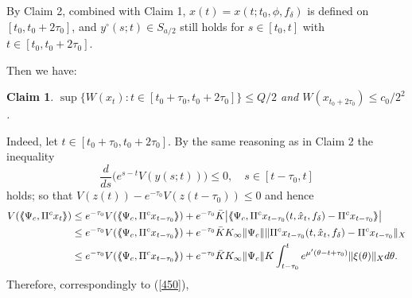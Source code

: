 \documentclass[12pt]{amsart}
\newtheorem{Claim}{Claim}
\begin{document}
\vskip 1mm
By Claim 2, combined with Claim 1, $x(t)=x(t;t_0,\phi,f_\delta)$ is defined on $[t_0,t_0+2\tau_0]$, and 
$y^\circ(s;t)\in S_{a/2}$ still holds for $s\in [t_0,t]$ with $t\in [t_0,t_0+2\tau_0]$. 

Then we have:

\begin{Claim}
$\sup\{W(x_t): t\in [t_0+\tau_0,t_0+2\tau_0]\} \leq Q/2$ 
and  $W(x_{t_0+2\tau_0})\leq c_0/2^2$. 
\end{Claim}
 
Indeed, let $t\in [t_0+\tau_0,t_0+2\tau_0]$. By the same reasoning as 
in Claim 2 the inequality  
$$
   \frac{d}{ds}\big( e^{s-t}V(y(s;t)) \big)\leq 0, \quad s\in [t-\tau_0,t]
$$
holds; so that $V(z(t))-e^{-\tau_0}V(z(t-\tau_0))\leq 0$ and hence 
\begin{align*}
   V({\langle\hspace{-1mm}\langle} \Psi_c,\Pi^c x_t{\rangle\hspace{-1mm}\rangle})
   &\leq e^{-\tau_0}V({\langle\hspace{-1mm}\langle}\Psi_c, \Pi^c x_{t-\tau_0} {\rangle\hspace{-1mm}\rangle})
         +e^{-\tau_0} \bar K \big|{\langle\hspace{-1mm}\langle} \Psi_c, \Pi^c 
          x_{t-\tau_0}(t,\hat x_t,f_\delta) - \Pi^c x_{t-\tau_0}{\rangle\hspace{-1mm}\rangle}\big| \\
   &\leq e^{-\tau_0}V({\langle\hspace{-1mm}\langle}\Psi_c, \Pi^c x_{t-\tau_0}{\rangle\hspace{-1mm}\rangle})
         +e^{-\tau_0} \bar K K_\infty\|\Psi_c\|  
         \|\Pi^c x_{t-\tau_0}(t,\hat x_t,f_\delta) - \Pi^c x_{t-\tau_0}\|_X \\
   &\leq e^{-\tau_0}V({\langle\hspace{-1mm}\langle}\Psi_c, \Pi^c x_{t-\tau_0} {\rangle\hspace{-1mm}\rangle})
         +e^{-\tau_0} \bar K K_\infty \|\Psi_c\|
         K\int_{t-\tau_0}^t e^{\mu'(\theta-t+\tau_0)}\|\xi(\theta)\|_Xd\theta. 
\end{align*}
Therefore, correspondingly to (\ref{450}),
\end{document}
